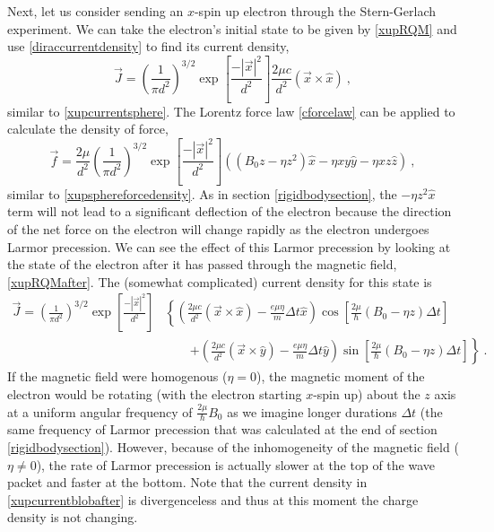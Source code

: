 \documentclass[onecolumn,secnumarabic,amsmath,amssymb,balancelastpage,nofootinbib]{article}
\begin{document}
Next, let us consider sending an $x$-spin up electron through the Stern-Gerlach experiment.  We can take the electron's initial state to be given by \eqref{xupRQM} and use \eqref{diraccurrentdensity} to find its current density,
\begin{equation}
\vec{J}=\left(\frac{1}{\pi d^2}\right)^{3/2} \exp\left[\frac{-|\vec{x}|^2}{d^2}\right] \frac{2 \mu c}{d^2} (\vec{x} \times \hat{x})
\ ,
\label{xupcurrentblob}
\end{equation}
similar to \eqref{xupcurrentsphere}.  The Lorentz force law \eqref{cforcelaw} can be applied to calculate the density of force,
\begin{equation}
\vec{f}=\frac{2\mu}{d^2}\left(\frac{1}{\pi d^2}\right)^{3/2} \exp\left[\frac{-|\vec{x}|^2}{d^2}\right] \left( (B_0 z - \eta z^2) \hat{x} - \eta x y \hat{y} - \eta x z \hat{z} \right)
\ ,
\label{xupforcedensityblob}
\end{equation}
similar to \eqref{xupsphereforcedensity}.  As in section \ref{rigidbodysection}, the $- \eta z^2 \hat{x}$ term will not lead to a significant deflection of the electron because the direction of the net force on the electron will change rapidly as the electron undergoes Larmor precession.  We can see the effect of this Larmor precession by looking at the state of the electron after it has passed through the magnetic field, \eqref{xupRQMafter}.  The (somewhat complicated) current density for this state is
\begin{align}
\vec{J}=\left(\frac{1}{\pi d^2}\right)^{3/2} \exp\left[\frac{-|\vec{x}|^2}{d^2}\right]&\left\{ \left(\frac{2 \mu c}{d^2} (\vec{x} \times \hat{x}) - \frac{e \mu \eta}{m}\Delta t \hat{x} \right)\cos\left[\frac{2 \mu}{\hbar} (B_0 - \eta z)\Delta t\right] \right.
\nonumber
\\
&\quad\quad\left.+\left(\frac{2 \mu c}{d^2} (\vec{x} \times \hat{y}) - \frac{e \mu \eta}{m}\Delta t \hat{y} \right)\sin\left[\frac{2 \mu}{\hbar} (B_0 - \eta z)\Delta t\right]\right\}
\ .
\label{xupcurrentblobafter}
\end{align}
If the magnetic field were homogenous ($\eta=0$), the magnetic moment of the electron would be rotating (with the electron starting $x$-spin up) about the $z$ axis at a uniform angular frequency of $\frac{2\mu}{\hbar} B_0$ as we imagine longer durations $\Delta t$ (the same frequency of Larmor precession that was calculated at the end of section \ref{rigidbodysection}).  However, because of the inhomogeneity of the magnetic field ($\eta \neq 0$), the rate of Larmor precession is actually slower at the top of the wave packet and faster at the bottom.  Note that the current density in \eqref{xupcurrentblobafter} is divergenceless and thus at this moment the charge density is not changing.
\end{document}
